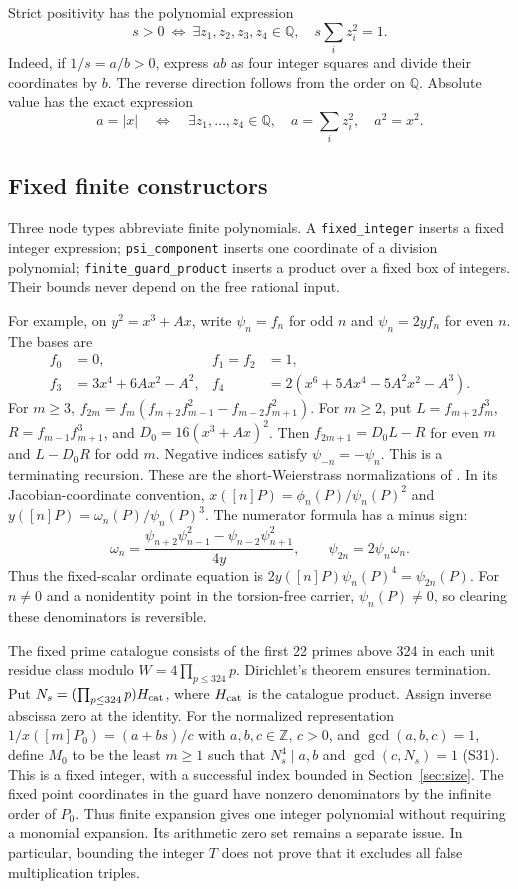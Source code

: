 \documentclass[11pt]{article}
\theoremstyle{definition}
\theoremstyle{remark}
\newcommand{\Q}{\mathbb Q}
\newcommand{\Z}{\mathbb Z}
\begin{document}
Strict positivity has the polynomial expression
\[
 s>0\ \Longleftrightarrow\
 \exists z_1,z_2,z_3,z_4\in\Q,\quad s\sum_i z_i^2=1.
\]
Indeed, if $1/s=a/b>0$, express $ab$ as four integer squares and divide
their coordinates by $b$. The reverse direction follows from the order
on $\Q$. Absolute value has the exact expression
\[
 a=|x|\quad\Longleftrightarrow\quad
 \exists z_1,\ldots,z_4\in\Q,\quad a=\sum_i z_i^2,\quad a^2=x^2.
\]

\subsection{Fixed finite constructors}
Three node types abbreviate finite polynomials. A
\texttt{fixed\_integer} inserts a fixed integer expression;
\texttt{psi\_component} inserts one coordinate of a division polynomial;
\texttt{finite\_guard\_product} inserts a product over a fixed box of
integers. Their bounds never depend on the free rational input.

For example, on $y^2=x^3+Ax$, write $\psi_n=f_n$ for odd $n$ and
$\psi_n=2yf_n$ for even $n$. The bases are
\begin{align*}
 f_0&=0,&f_1=f_2&=1,\\
 f_3&=3x^4+6Ax^2-A^2,&
 f_4&=2(x^6+5Ax^4-5A^2x^2-A^3).
\end{align*}
For $m\ge3$,
$f_{2m}=f_m(f_{m+2}f_{m-1}^2-f_{m-2}f_{m+1}^2)$.
For $m\ge2$, put $L=f_{m+2}f_m^3$, $R=f_{m-1}f_{m+1}^3$, and
$D_0=16(x^3+Ax)^2$. Then $f_{2m+1}=D_0L-R$ for even $m$ and
$L-D_0R$ for odd $m$. Negative indices satisfy $\psi_{-n}=-\psi_n$.
This is a terminating recursion. These are the short-Weierstrass
normalizations of \cite[\S\S5.5--5.6, Lemmas 5.20 and 5.24, Theorem 5.21]{sutherland}.
In its Jacobian-coordinate convention,
$x([n]P)=\phi_n(P)/\psi_n(P)^2$ and
$y([n]P)=\omega_n(P)/\psi_n(P)^3$.
The numerator formula has a minus sign:
\[
 \omega_n=\frac{\psi_{n+2}\psi_{n-1}^2-
                   \psi_{n-2}\psi_{n+1}^2}{4y},
 \qquad \psi_{2n}=2\psi_n\omega_n.
\]
Thus the fixed-scalar ordinate equation is
$2y([n]P)\psi_n(P)^4=\psi_{2n}(P)$.
For $n\ne0$ and a nonidentity point in the torsion-free carrier,
$\psi_n(P)\ne0$, so clearing these denominators is reversible.

The fixed prime catalogue consists of the first 22 primes above 324 in
each unit residue class modulo $W=4\prod_{p\le324}p$. Dirichlet's theorem
ensures termination. Put $N_s=(\prod_{p\le324}p)H_{\rm cat}$, where
$H_{\rm cat}$ is the catalogue product. Assign inverse abscissa zero
at the identity. For the normalized representation
$1/x([m]P_0)=(a+bs)/c$ with $a,b,c\in\Z$, $c>0$, and
$\gcd(a,b,c)=1$, define $M_0$ to be the least $m\ge1$ such that
$N_s^4\mid a,b$ and $\gcd(c,N_s)=1$ (S31).
This is a fixed integer, with a successful index bounded in
Section~\ref{sec:size}.
The fixed point coordinates in the guard have nonzero denominators by
the infinite order of $P_0$. Thus finite expansion gives one integer
polynomial without requiring a monomial expansion. Its arithmetic zero
set remains a separate issue. In particular, bounding the integer $T$
does not prove that it excludes all false multiplication triples.
\end{document}
